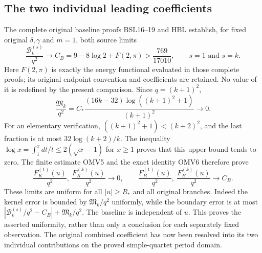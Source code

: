 \documentclass[11pt,a4paper]{article}
\begin{document}
\subsection{The two individual leading coefficients}
The complete original baseline proofs BSL16--19 and HBL establish,
for fixed original $\delta,\gamma$ and $m=1$, both source limits
\[
 \frac{\mathcal B_k^{(s)}}{q^2}\longrightarrow
 C_B=9-8\log2+F(2,\pi)>\frac{769}{17010},
 \qquad s=1\text{ and }s=k.
 \tag{OMV8}
\]
Here $F(2,\pi)$ is exactly the energy functional evaluated in those
complete proofs; its original endpoint convention and coefficients
are retained. No value of it is redefined by the present comparison.
Since $q=(k+1)^2$,
\[
 \frac{\mathfrak M_k}{q^2}
   =C_*\frac{(16k-32)\log((k+1)^2+1)}{(k+1)^2}
               \longrightarrow0.
\]
For an elementary verification, $((k+1)^2+1)<(k+2)^2$, and
the last fraction is at most $32\log(k+2)/k$. The inequality
$\log x=\int_1^x dt/t\leq2(\sqrt x-1)$ for $x\geq1$
proves that this upper bound tends to zero. The finite estimate
OMV5 and the exact identity OMV6 therefore prove
\[
 \boxed{\quad
 \frac{F_K^{(1)}(u)}{q^2},\ \frac{F_K^{(k)}(u)}{q^2}
       \longrightarrow0,\qquad
 \frac{F_B^{(1)}(u)}{q^2},\ \frac{F_B^{(k)}(u)}{q^2}
       \longrightarrow C_B.
 \quad}\tag{OMV9}
\]
These limits are uniform for all $|u|\geq R_*$ and all original
branches. Indeed the kernel error is bounded by
$\mathfrak M_k/q^2$ uniformly, while the boundary error is at
most
$|\mathcal B_k^{(s)}/q^2-C_B|+\mathfrak M_k/q^2$.
The baseline is independent of $u$. This proves the asserted
uniformity, rather than only a conclusion for each separately
fixed observation. The original combined coefficient has now been
resolved into its two individual contributions on the proved
simple-quartet period domain.
\end{document}

